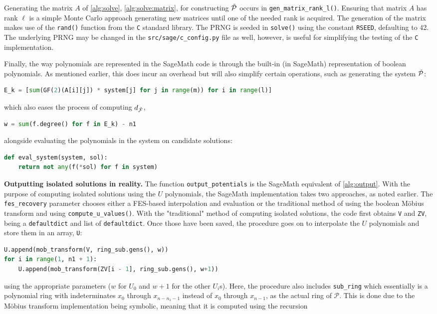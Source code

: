 Generating the matrix $A$ of \cref{alg:solve}, \cref{alg:solve:matrix}, for constructing $\Tilde{\mathcal{P}}$ occurs in \texttt{gen\_matrix\_rank\_l()}. Ensuring that matrix $A$ has rank $\ell$ is a simple Monte Carlo approach generating new matrices until one of the needed rank is acquired. The generation of the matrix makes use of the \texttt{rand()} function from the \texttt{C} standard library. The PRNG is seeded in \texttt{solve()} using the constant \texttt{RSEED}, defaulting to 42. The underlying PRNG may be changed in the \texttt{src/sage/c\_config.py} file as well, however, is useful for simplifying the testing of the \texttt{C} implementation.

Finally, the way polynomials are represented in the SageMath code is through the built-in (in SageMath) representation of boolean polynomials. As mentioned earlier, this does incur an overhead but will also simplify certain operations, such as generating the system $\Tilde{\mathcal{P}}$:
\begin{lstlisting}[language=Python,style=mystyle]
E_k = [sum(GF(2)(A[i][j]) * system[j] for j in range(m)) for i in range(l)]
\end{lstlisting}
which also eases the process of computing $d_{\Tilde{\mathcal{F}}}$,
\begin{lstlisting}[language=Python,style=mystyle]
w = sum(f.degree() for f in E_k) - n1 
\end{lstlisting}
alongside evaluating the polynomials in the system on candidate solutions:
\begin{lstlisting}[language=Python,style=mystyle]
def eval_system(system, sol):
    return not any(f(*sol) for f in system)
\end{lstlisting}

\textbf{Outputting isolated solutions in reality.} The function \texttt{output\_potentials} is the SageMath equivalent of \cref{alg:output}. With the purpose of computing isolated solutions using the $U$ polynomials, the SageMath implementation takes two approaches, as noted earlier. The \texttt{fes\_recovery} parameter chooses either a FES-based interpolation and evaluation or the traditional method of using the boolean Möbius transform and using \texttt{compute\_u\_values()}. With the "traditional" method of computing isolated solutions, the code first obtains \texttt{V} and \texttt{ZV}, being a \texttt{defaultdict} and list of \texttt{defaultdict}. Once those have been saved, the procedure goes on to interpolate the $U$ polynomials and store them in an array, \texttt{U}:
\begin{lstlisting}[language=Python,style=mystyle]
U.append(mob_transform(V, ring_sub.gens(), w))
for i in range(1, n1 + 1):
    U.append(mob_transform(ZV[i - 1], ring_sub.gens(), w+1))
\end{lstlisting}
using the appropriate parameters ($w$ for $U_0$ and $w + 1$ for the other $U_i$s). Here, the procedure also includes \texttt{sub\_ring} which essentially is a polynomial ring with indeterminates $x_0$ through $x_{n - n_1 - 1}$ instead of $x_0$ through $x_{n - 1}$, as the actual ring of $\mathcal{P}$. This is done due to the Möbius transform implementation being symbolic, meaning that it is computed using the recursion 

